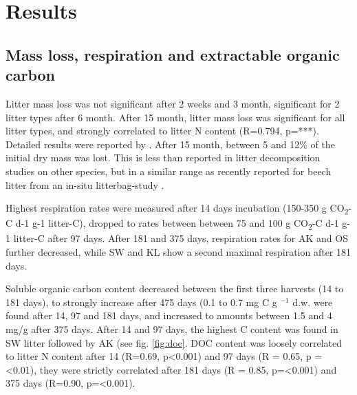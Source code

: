 \documentclass[authoryear,preprint,review,12pt]{elsarticle}
\begin{document}
\section{Results}

\subsection{Mass loss, respiration and extractable organic carbon}

Litter mass loss was not significant after 2 weeks and 3 month, significant for 2 litter types after 6 month. After 15 month, litter mass loss was significant for all litter types, and strongly correlated to litter N content (R=0.794, p=***). Detailed results were reported by \citep{Mooshammer2011}. After 15 month, between 5 and 12\% of the initial dry mass was lost. This is less than reported in litter decomposition studies on other species, but in a similar range as recently reported for beech litter from an in-situ litterbag-study \citep{Kalbitz2006} .

Highest respiration rates were measured after 14 days incubation (150-350 \textmu g CO\textsubscript{2}-C d-1 g-1 litter-C), dropped to rates between between 75 and 100 \textmu g CO\textsubscript{2}-C d-1 g-1 litter-C after 97 days. After 181 and 375 days, respiration rates for AK and OS further decreased, while SW and KL show a second maximal respiration after 181 days. %

Soluble organic carbon content decreased between the first three harvests (14 to 181 days), to strongly increase after 475 days (0.1 to 0.7 mg C g $^{-1}$ d.w. were found after 14, 97 and 181 days, and increased to amounts between 1.5 and 4 mg/g after 375 days. After 14 and 97 days, the highest C content was found in SW litter followed by AK (see fig. \ref{fig:doc}. DOC content was loosely correlated to litter N content after 14 (R=0.69, p\textless  0.001) and 97 days (R = 0.65, p =\textless  0.01), they were strictly correlated after 181 days (R = 0.85, p=\textless  0.001) and 375 days (R=0.90, p=\textless  0.001).

\end{document}
